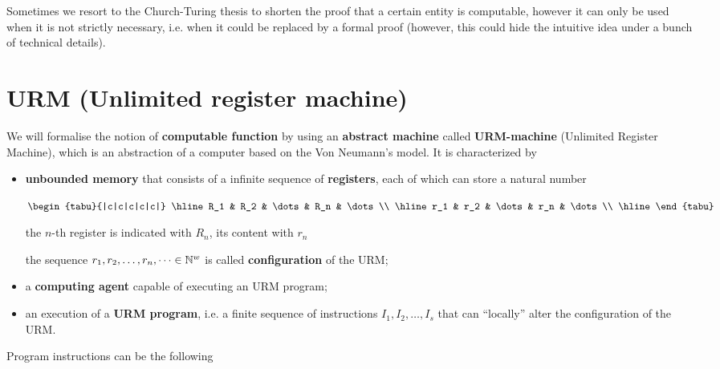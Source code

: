 Sometimes we resort to the Church-Turing thesis to shorten the proof that a certain entity is computable, however it can only be used when it is not strictly necessary, i.e. when it could be replaced by a formal proof
(however, this could hide the intuitive idea under a bunch of technical details).

\section{URM (Unlimited register machine)}

We will formalise the notion of \textbf{computable function} by using an \textbf{abstract machine} 
called \textbf{URM-machine} (Unlimited Register Machine), 
which is an abstraction of a computer based on the Von Neumann's model. It is characterized by

\begin{itemize}
\item \textbf{unbounded memory} that consists of a infinite sequence of \textbf{registers}, each of which can store a  natural number


  $\begin{tabu}{|c|c|c|c|c|}
    \hline
    R_1 & R_2 & \dots & R_n & \dots \\
    \hline
    r_1 & r_2 & \dots & r_n & \dots \\
    \hline
  \end{tabu}$

  the $n$-th register is indicated with $R_n$, its content with $r_n$

  the sequence $r_1, r_2,\dots, r_n, \dots \in \mathbb{N}^w$ is called
  \textbf{configuration} of the URM;

\item a \textbf{computing agent} capable of executing an URM program;

\item an execution of a \textbf{URM program}, i.e. a finite sequence of instructions
  $I_1, I_2, \dots, I_s$ that can ``locally'' alter the configuration
  of the URM.
\end{itemize}


Program instructions can be the following

